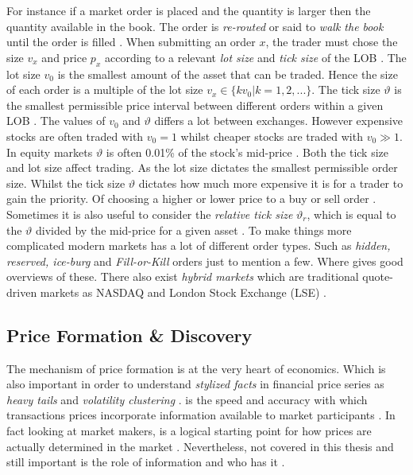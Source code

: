 \documentclass{kththesis}
\theoremstyle{definition}
\begin{document}
\newpage
For instance if a market order is placed and the quantity is larger then the quantity available in the book. The order is \textit{re-routed} or said to \textit{walk the book} until the order is filled \parencite{hasbrouck2007empirical,cartea2015algorithmic}. When submitting an order $x$, the trader must chose the size $v_x$ and price $p_{x}$ according to a relevant \textit{lot size} and \textit{tick size} of the LOB \parencite{bouchaud2018trades}. The lot size $v_0$ is the smallest amount of the asset that can be traded. Hence the size of each order is a multiple of the lot size $v_{x} \in \{kv_{0} | k = 1,2,...\}$. The tick size $\vartheta$ is the smallest permissible price interval between different orders within a given LOB \parencite{bouchaud2018trades}. The values of $v_{0}$ and $\vartheta$ differs a lot between exchanges. However expensive stocks are often traded with $v_0 = 1$ whilst cheaper stocks are traded with $v_{0} \gg 1$. In equity markets $\vartheta$ is often 0.01\% of the stock's mid-price \parencite{bouchaud2018trades}. 
\newline
\newline
Both the tick size and lot size affect trading. As the lot size dictates the smallest permissible order size. Whilst the tick size $\vartheta$ dictates how much more expensive it is for a trader to gain the priority. Of choosing a higher or lower price to a buy or sell order \parencite{bouchaud2018trades}. Sometimes it is also useful to consider the \textit{relative tick size} $\vartheta_r$, which is equal to the $\vartheta$ divided by the mid-price for a given asset \parencite{bouchaud2018trades}. To make things more complicated modern markets has a lot of different order types. Such as \textit{hidden, reserved, ice-burg} and \textit{Fill-or-Kill} orders just to mention a few. Where \parencite{foucault2013market, cartea2015algorithmic, hasbrouck2007empirical} gives good overviews of these. There also exist \textit{hybrid markets} which are traditional quote-driven markets as NASDAQ and London Stock Exchange (LSE) \parencite{foucault2013market}.

\subsection{Price Formation \& Discovery}

The mechanism of price formation is at the very heart of economics.  Which is also important in order to understand \textit{stylized facts} in financial price series as \textit{heavy tails} and \textit{volatility clustering}  \parencite{abergel2012market}.  is the speed and accuracy with which transactions prices incorporate information available to market participants \parencite{foucault2013market}. In fact looking at market makers, is a logical starting point for how prices are actually determined in the market \parencite{madhavan2000market}. Nevertheless, not covered in this thesis and still important is the role of information and who has it \parencite{cartea2015algorithmic}.
\end{document}
